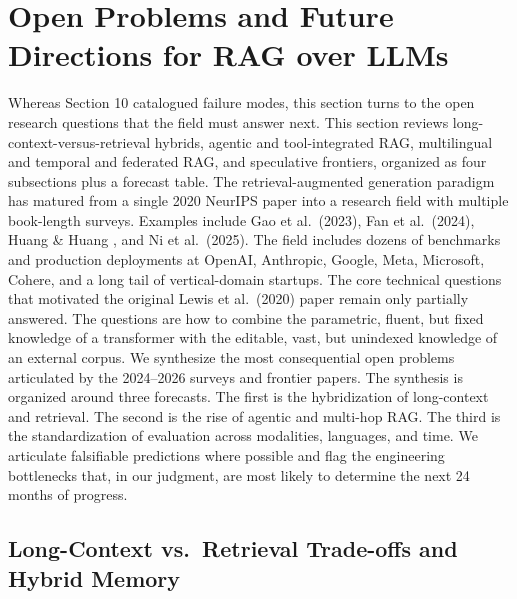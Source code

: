 \documentclass{article}
\begin{document}
\section{Open Problems and Future Directions for RAG over LLMs}\label{open-problems-and-future-directions-for-rag-over-llms}

Whereas Section 10 catalogued failure modes, this section turns to the open research questions that the field must answer next. This section reviews long-context-versus-retrieval hybrids, agentic and tool-integrated RAG, multilingual and temporal and federated RAG, and speculative frontiers, organized as four subsections plus a forecast table. The retrieval-augmented generation paradigm has matured from a single 2020 NeurIPS paper into a research field with multiple book-length surveys. Examples include Gao et al.~(2023), Fan et al.~(2024), Huang \& Huang \citet{huang2026asurveyonretrieval}, and Ni et al.~(2025). The field includes dozens of benchmarks and production deployments at OpenAI, Anthropic, Google, Meta, Microsoft, Cohere, and a long tail of vertical-domain startups. The core technical questions that motivated the original Lewis et al.~(2020) paper remain only partially answered. The questions are how to combine the parametric, fluent, but fixed knowledge of a transformer with the editable, vast, but unindexed knowledge of an external corpus. We synthesize the most consequential open problems articulated by the 2024--2026 surveys and frontier papers. The synthesis is organized around three forecasts. The first is the hybridization of long-context and retrieval. The second is the rise of agentic and multi-hop RAG. The third is the standardization of evaluation across modalities, languages, and time. We articulate falsifiable predictions where possible and flag the engineering bottlenecks that, in our judgment, are most likely to determine the next 24 months of progress.

\subsection{Long-Context vs.~Retrieval Trade-offs and Hybrid Memory}\label{long-context-vs.-retrieval-trade-offs-and-hybrid-memory}
\end{document}
